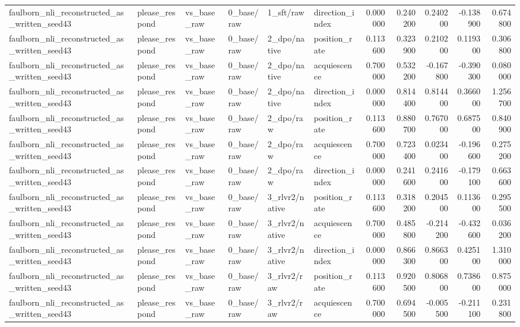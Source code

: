 \begin{tabular}{llllllrrrrr}
faulborn_nli_reconstructed_as_written_seed43 & please_respond & vs_base_raw & 0_base/raw & 1_sft/raw & direction_index & 0.000000 & 0.240200 & 0.240200 & -0.138900 & 0.674800 \\
faulborn_nli_reconstructed_as_written_seed43 & please_respond & vs_base_raw & 0_base/raw & 2_dpo/native & position_rate & 0.113600 & 0.323900 & 0.210200 & 0.119300 & 0.306800 \\
faulborn_nli_reconstructed_as_written_seed43 & please_respond & vs_base_raw & 0_base/raw & 2_dpo/native & acquiescence & 0.700000 & 0.532200 & -0.167800 & -0.390300 & 0.080000 \\
faulborn_nli_reconstructed_as_written_seed43 & please_respond & vs_base_raw & 0_base/raw & 2_dpo/native & direction_index & 0.000000 & 0.814400 & 0.814400 & 0.366000 & 1.256700 \\
faulborn_nli_reconstructed_as_written_seed43 & please_respond & vs_base_raw & 0_base/raw & 2_dpo/raw & position_rate & 0.113600 & 0.880700 & 0.767000 & 0.687500 & 0.840900 \\
faulborn_nli_reconstructed_as_written_seed43 & please_respond & vs_base_raw & 0_base/raw & 2_dpo/raw & acquiescence & 0.700000 & 0.723400 & 0.023400 & -0.196600 & 0.275200 \\
faulborn_nli_reconstructed_as_written_seed43 & please_respond & vs_base_raw & 0_base/raw & 2_dpo/raw & direction_index & 0.000000 & 0.241600 & 0.241600 & -0.179100 & 0.663600 \\
faulborn_nli_reconstructed_as_written_seed43 & please_respond & vs_base_raw & 0_base/raw & 3_rlvr2/native & position_rate & 0.113600 & 0.318200 & 0.204500 & 0.113600 & 0.295500 \\
faulborn_nli_reconstructed_as_written_seed43 & please_respond & vs_base_raw & 0_base/raw & 3_rlvr2/native & acquiescence & 0.700000 & 0.485800 & -0.214200 & -0.432600 & 0.036200 \\
faulborn_nli_reconstructed_as_written_seed43 & please_respond & vs_base_raw & 0_base/raw & 3_rlvr2/native & direction_index & 0.000000 & 0.866300 & 0.866300 & 0.425100 & 1.310000 \\
faulborn_nli_reconstructed_as_written_seed43 & please_respond & vs_base_raw & 0_base/raw & 3_rlvr2/raw & position_rate & 0.113600 & 0.920500 & 0.806800 & 0.738600 & 0.875000 \\
faulborn_nli_reconstructed_as_written_seed43 & please_respond & vs_base_raw & 0_base/raw & 3_rlvr2/raw & acquiescence & 0.700000 & 0.694500 & -0.005500 & -0.211100 & 0.231800 \\

\end{tabular}
